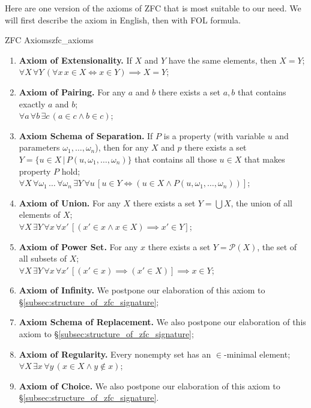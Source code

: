 \documentclass[../main.tex]{subfiles}
\begin{document}
Here are one version of the axioms of ZFC that is most suitable to our need. We will first describe the axiom in English, then with FOL formula.
\begin{axiom}{ZFC Axioms}{zfc_axioms}
\begin{enumerate}
    \item \textbf{Axiom of Extensionality.} If $X$ and $Y$ have the same elements, then $X=Y$;\\$\forall X\,\forall Y\,(\forall x\,x\in X\iff x\in Y)\implies X=Y$;
    \item \textbf{Axiom of Pairing.}  For any $a$ and $b$ there exists a set ${a,b}$ that contains exactly $a$ and $b$;\\$\forall a\,\forall b\,\exists c\,(a\in c\land b\in c)$;
    \item \textbf{Axiom Schema of Separation.}  If $P$ is a property (with variable $u$ and parameters $\omega_1,\dots,\omega_n$), then for any $X$ and $p$ there exists a set $Y=\{u\in X\,|\,P(u,\omega_1,\dots,\omega_n)\}$ that contains all those $u\in X$ that makes property $P$ hold;\\$\forall X\,\forall \omega_1\,\dots\,\forall \omega_n\,\exists Y\,\forall u\,[u\in Y\iff(u\in X\land P(u,\omega_1,\dots,\omega_n))]$;
    \item \textbf{Axiom of Union.}  For any $X$ there exists a set $Y=\bigcup X$, the union of all elements of $X$;\\$\forall X\,\exists Y\,\forall x\,\forall x'\,[(x'\in x\land x\in X)\implies x'\in Y]$;
    \item \textbf{Axiom of Power Set.}  For any $x$ there exists a set $Y=\mathcal{P}(X)$, the set of all subsets of $X$;\\$\forall X\,\exists Y\,\forall x\,\forall x'\,[(x'\in x)\implies(x'\in X)]\implies x\in Y$;
    \item \textbf{Axiom of Infinity.}  We postpone our elaboration of this axiom to \S\ref{subsec:structure_of_zfc_signature};
    \item \textbf{Axiom Schema of Replacement.}  We also postpone our elaboration of this axiom to \S\ref{subsec:structure_of_zfc_signature};
    \item \textbf{Axiom of Regularity.}  Every nonempty set has an $\in$-minimal element;\\$\forall X\,\exists x\,\forall y\,(x\in X\land y\notin x)$;
    \item \textbf{Axiom of Choice.}  We also postpone our elaboration of this axiom to \S\ref{subsec:structure_of_zfc_signature}.
\end{enumerate}
\end{axiom}
\end{document}
